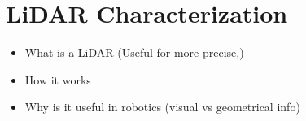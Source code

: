 \chapter{LiDAR Characterization}

\begin{itemize}
    \item What is a LiDAR (Useful for more precise,)
    \item How it works
    \item Why is it useful in robotics (visual vs geometrical info)
\end{itemize}





